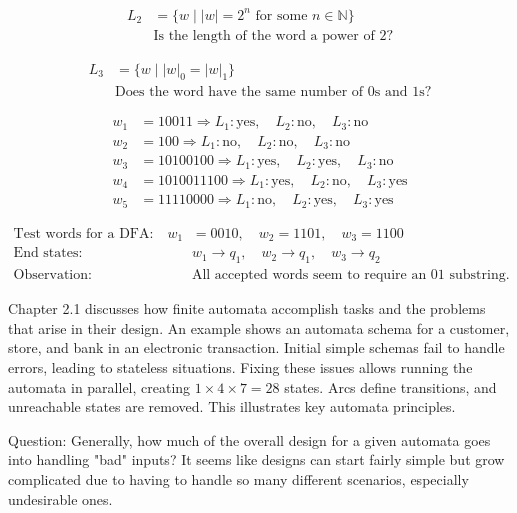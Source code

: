 \documentclass{article}
\theoremstyle{theorem}
\theoremstyle{definition}
\theoremstyle{remark}
\begin{document}
\begin{align*}
L_2 &= \{ w \mid |w| = 2^n \text{ for some } n \in \mathbb{N} \} \\
    &\text{Is the length of the word a power of 2?}
\end{align*}

\begin{align*}
L_3 &= \{ w \mid |w|_0 = |w|_1 \} \\
    &\text{Does the word have the same number of 0s and 1s?}
\end{align*}

\begin{align*}
w_1 &= 10011 \Rightarrow L_1: \text{yes},\quad L_2: \text{no},\quad L_3: \text{no} \\
w_2 &= 100   \Rightarrow L_1: \text{no},\quad L_2: \text{no},\quad L_3: \text{no} \\
w_3 &= 10100100 \Rightarrow L_1: \text{yes},\quad L_2: \text{yes},\quad L_3: \text{no} \\
w_4 &= 1010011100 \Rightarrow L_1: \text{yes},\quad L_2: \text{no},\quad L_3: \text{yes} \\
w_5 &= 11110000 \Rightarrow L_1: \text{no},\quad L_2: \text{yes},\quad L_3: \text{yes}
\end{align*}

\begin{align*}
\text{Test words for a DFA:} \quad w_1 &= 0010,\quad w_2 = 1101,\quad w_3 = 1100 \\
\text{End states:} \quad &w_1 \rightarrow q_1,\quad w_2 \rightarrow q_1,\quad w_3 \rightarrow q_2 \\
\text{Observation:} \quad &\text{All accepted words seem to require an } 01 \text{ substring.}
\end{align*}

Chapter 2.1 discusses how finite automata accomplish tasks and the problems that arise in their design. An example shows an automata schema for a customer, store, and bank in an electronic transaction. Initial simple schemas fail to handle errors, leading to stateless situations. Fixing these issues allows running the automata in parallel, creating $1 \times 4 \times 7 = 28$ states. Arcs define transitions, and unreachable states are removed. This illustrates key automata principles.

Question: Generally, how much of the overall design for a given automata goes into handling "bad" inputs? It seems like designs can start fairly simple but grow complicated due to having to handle so many different scenarios, especially undesirable ones.
\end{document}
